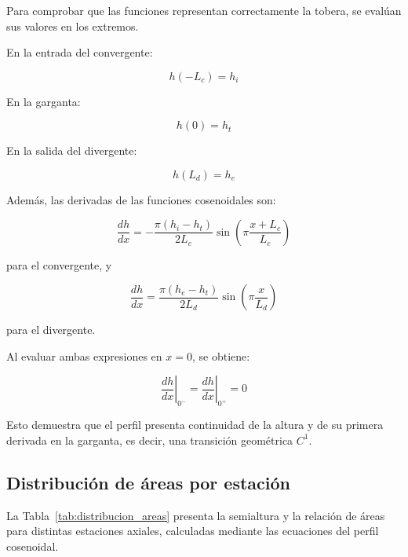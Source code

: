 \documentclass[12pt,letterpaper]{article}
\numberwithin{equation}{section}
\begin{document}
Para comprobar que las funciones
representan correctamente la tobera,
se evalúan sus valores en los extremos.

En la entrada del convergente:

\begin{equation}
h(-L_c)=h_i
\end{equation}

En la garganta:

\begin{equation}
h(0)=h_t
\end{equation}

En la salida del divergente:

\begin{equation}
h(L_d)=h_e
\end{equation}

Además, las derivadas de las
funciones cosenoidales son:

\begin{equation}
\frac{dh}{dx}
=-\frac{\pi(h_i-h_t)}{2L_c}
\sin\left(
\pi\frac{x+L_c}{L_c}
\right)
\end{equation}

para el convergente, y

\begin{equation}
\frac{dh}{dx}
=\frac{\pi(h_e-h_t)}{2L_d}
\sin\left(
\pi\frac{x}{L_d}
\right)
\end{equation}

para el divergente.

Al evaluar ambas expresiones
en $x=0$, se obtiene:

\begin{equation}
\left.\frac{dh}{dx}\right|_{0^-}
=
\left.\frac{dh}{dx}\right|_{0^+}
=0
\end{equation}

Esto demuestra que el perfil
presenta continuidad de la
altura y de su primera derivada
en la garganta, es decir,
una transición geométrica $C^1$.

\subsection{Distribución de áreas por estación}

La Tabla~\ref{tab:distribucion_areas}
presenta la semialtura y la relación
de áreas para distintas estaciones
axiales, calculadas mediante las
ecuaciones del perfil cosenoidal.
\end{document}
